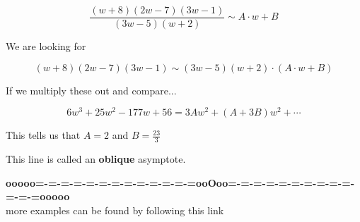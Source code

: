 \documentclass{ximera}
\begin{document}
\[ \frac{(w+8)(2w-7)(3w-1)}{(3w-5)(w+2)}    \sim    A \cdot w + B  \]




We are looking for 



\[ (w+8)(2w-7)(3w-1)   \sim   (3w-5)(w+2) \cdot  (A \cdot w + B)  \]



If we multiply these out and compare...


\[
6 w^3 + 25 w^2 - 177 w + 56 = 3A w^2 + (A + 3B) w^2 + \cdots
\]


This tells us that $A = 2$ and $B = \frac{23}{3}$




\begin{center}
\end{center}

This line is called an \textbf{oblique} asymptote.






















\begin{center}
\textbf{\textcolor{green!50!black}{ooooo=-=-=-=-=-=-=-=-=-=-=-=-=ooOoo=-=-=-=-=-=-=-=-=-=-=-=-=ooooo}} \\

more examples can be found by following this link\\ 

\end{center}
\end{document}
